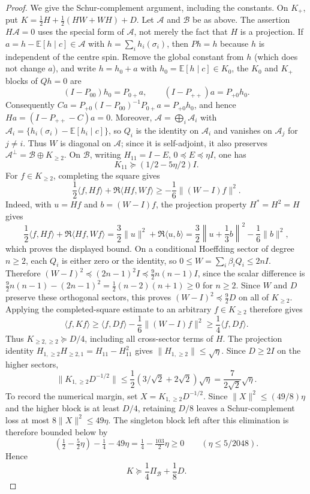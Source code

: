 \begin{proof}
We give the Schur-complement argument, including the constants.  On
$K_+$, put $K=\tfrac12H+\tfrac12(HW+WH)+D$.  Let
$\mathcal A$ and $\mathcal B$ be as above.  The assertion
$H\mathcal A=0$ uses the special form of $\mathcal A$, not merely the
fact that $H$ is a projection.  If
$a=h-\mathbb E[h\mid c]\in\mathcal A$ with
$h=\sum_i h_i(\sigma_i)$, then $Ph=h$ because $h$ is independent of the
centre spin.  Remove the global constant from $h$ (which does not change
$a$), and write $h=h_0+a$ with
$h_0=\mathbb E[h\mid c]\in K_0$, the $K_0$ and $K_+$ blocks of $Qh=0$
are
\[
 (I-P_{00})h_0=P_{0+}a,
 \qquad (I-P_{++})a=P_{+0}h_0.
\]
Consequently $Ca=P_{+0}(I-P_{00})^{-1}P_{0+}a=P_{+0}h_0$, and hence
$Ha=(I-P_{++}-C)a=0$.  Moreover,
$\mathcal A=\bigoplus_i\mathcal A_i$ with
$\mathcal A_i=\{h_i(\sigma_i)-\mathbb E[h_i\mid c]\}$, so $Q_i$ is the
identity on $\mathcal A_i$ and vanishes on $\mathcal A_j$ for $j\ne i$.
Thus $W$ is diagonal on $\mathcal A$; since it is self-adjoint, it also
preserves $\mathcal A^\perp=\mathcal B\oplus K_{\ge2}$.
On $\mathcal B$, writing $H_{11}=I-E$, $0\preceq E\preceq\eta I$, one has
\begin{equation}\label{eq:sg-singleton-block}
 K_{11}\succeq(1/2-5\eta/2)I.
\end{equation}
For $f\in K_{\ge2}$, completing the square gives
\[
 \frac{1}{2}\langle f,Hf\rangle+\Re\langle Hf,Wf\rangle
 \ge-\frac{1}{6}\|(W-I)f\|^2.
\]
Indeed, with $u=Hf$ and $b=(W-I)f$, the projection property
$H^*=H^2=H$ gives
\[
 \frac12\langle f,Hf\rangle+\Re\langle Hf,Wf\rangle
 =\frac32\|u\|^2+\Re\langle u,b\rangle
 =\frac32\left\|u+\frac13b\right\|^2-\frac16\|b\|^2,
\]
which proves the displayed bound.  On a conditional Hoeffding sector of
degree $n\ge2$, each $Q_i$ is either zero or the identity, so
$0\le W=\sum_i\beta_iQ_i\le2nI$.  Therefore
$(W-I)^2\preceq(2n-1)^2I\preceq\frac92n(n-1)I$, since the scalar
difference is
$\frac92n(n-1)-(2n-1)^2=\frac12(n-2)(n+1)\ge0$ for $n\ge2$.
Since $W$ and $D$ preserve these orthogonal sectors, this proves
$(W-I)^2\preceq\frac92D$ on all of $K_{\ge2}$.  Applying the
completed-square estimate to an arbitrary $f\in K_{\ge2}$ therefore gives
\[
 \langle f,Kf\rangle
 \ge \langle f,Df\rangle-\frac16\|(W-I)f\|^2
 \ge\frac14\langle f,Df\rangle.
\]
Thus $K_{\ge2,\ge2}\succeq D/4$, including all cross-sector terms of $H$.
The projection identity
$H_{1,\ge2}H_{\ge2,1}=H_{11}-H_{11}^2$ gives
$\|H_{1,\ge2}\|\le\sqrt\eta$.  Since $D\ge2I$ on the higher sectors,
\[
 \|K_{1,\ge2}D^{-1/2}\|
 \le \frac{1}{2}(3/\sqrt2+2\sqrt2)\sqrt\eta
 =\frac{7}{2\sqrt2}\sqrt\eta .
\]
To record the numerical margin, set
$X=K_{1,\ge2}D^{-1/2}$.  Since
$\|X\|^2\le(49/8)\eta$ and the higher block is at least $D/4$, retaining
$D/8$ leaves a Schur-complement loss at most
$8\|X\|^2\le49\eta$.  The singleton block left after this elimination
is therefore bounded below by
\[
 \left(\tfrac12-\tfrac52\eta\right)-\tfrac14-49\eta
 =\tfrac14-\tfrac{103}{2}\eta\ge0
 \qquad(\eta\le5/2048).
\]
Hence
\begin{equation}\label{eq:sg-coercivity}
 K\succeq \frac{1}{4}\Pi_{\mathcal B}+\frac{1}{8}D.
\end{equation}


\end{proof}
